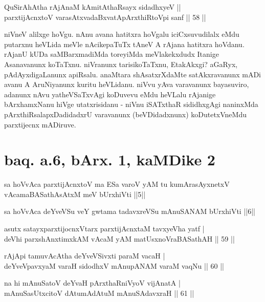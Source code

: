 \begin{shl}
QuSirAhAtha rAjAnaM kAmitAthaRsayx sidadhxyeV || \\
parxtijAcnxtoV varasAtxvadaBxvatA\s pArxthiRtoV\s pi sanf \hfill|| 58 || 
\end{shl}

\begin{artha}
niVneV alilxge hoVgu. nAnu avana hatitxra hoVgalu iciCxsuvudilalx eMdu 
putarxnu heVLida meVle nAcikepaTuTx tAneV A rAjana hatitxra hoVdanu. 
rAjanU kUDa saMBarxmadiMda toreyiMda meVlakekxdudx Itanige Asanavanunx 
koTaTxnu. niVranunx tarisikoTaTxnu, EtakAkxgi? aGaRyx, 
pAdAyxdigaLanunx apiRsalu. anaMtara shAsatxrXdaMte satAkxravanunx mADi 
avanu A AruNiyanunx kuritu heVLidanu. niVvu yAva varavanunx 
bayasuviro, adanunx nAvu yatheVSaTxvAgi koDuvevu eMdu heVLalu rAjanige 
bArxhamxNanu hiVge utatxrisidanu - niVnu iSATxthaR sididhxgAgi 
naninxMda pArxthiRsalapxDadidadxrU varavanunx (beVDidadxnunx) 
koDutetxVneMdu parxtijecnx mADiruve.
\end{artha}

\section*{baq. a.6, bArx. 1, kaMDike 2}

\begin{shl}
sa hoVvAca parxtijAcnxtoV ma ESa varoV yAM tu kumArasAyxnetxV vAcamaBASathAsAtxM meV bUrxhiVti ||5||
\end{shl}

\begin{shl}
sa hoVvAca deYveVSu veY gwtama tadavxreVSu mAnuSANAM bUrxhiVti ||6||
\end{shl}

\begin{shl}
asutx satayxparxtijocnxV\s tarx parxtijAcnxtaM tavxyeVha yatf | \\
deVhi parxshAnxtimxkAM vAcaM yAM matUsxnoVraBASathAH \hfill|| 59 || 
\end{shl}

\begin{shl}
rAjA\s pi tamuvAcAtha deYveVSivxti paraM vacaH | \\
deYveVpavxyaM varaH sidodhxV mAnupANAM varaM vaqNu \hfill|| 60 || 
\end{shl}

\begin{shl}
na hi mAnuSatoV deYvaH pArxthaRniVyoV vijAnatA | \\
mAnuSasUtxcitoV dAtumAdAtuM mAnuSAdavxraH \hfill|| 61 || 
\end{shl}

